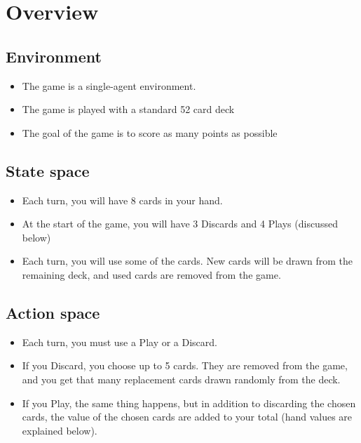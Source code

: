\documentclass[11pt]{article}
\author{Kevin James}
\date{\today}
\title{}
\begin{document}
\section{Overview}
\label{sec:orgd293114}
\subsection{Environment}
\label{sec:orge3ef2ec}
\begin{itemize}
\item The game is a single-agent environment.
\item The game is played with a standard 52 card deck
\item The goal of the game is to score as many points as possible
\end{itemize}
\subsection{State space}
\label{sec:orgb70674d}
\begin{itemize}
\item Each turn, you will have 8 cards in your hand.
\item At the start of the game, you will have 3 Discards and 4 Plays (discussed below)
\item Each turn, you will use some of the cards.  New cards will be drawn from the remaining deck, and used cards are removed from the game.
\end{itemize}
\subsection{Action space}
\label{sec:org897c33b}
\begin{itemize}
\item Each turn, you must use a Play or a Discard.
\item If you Discard, you choose up to 5 cards.  They are removed from the game, and you get that many replacement cards drawn randomly from the deck.
\item If you Play, the same thing happens, but in addition to discarding the chosen cards, the value of the chosen cards are added to your total (hand values are explained below).
\end{itemize}
\end{document}
